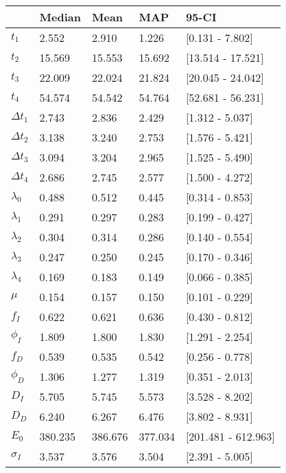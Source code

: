 \begin{tabular}{lllll}
\toprule
{} &   Median &     Mean &      MAP &                95-CI \\
\midrule
$t_1$        &    2.552 &    2.910 &    1.226 &      [0.131 - 7.802] \\
$t_2$        &   15.569 &   15.553 &   15.692 &    [13.514 - 17.521] \\
$t_3$        &   22.009 &   22.024 &   21.824 &    [20.045 - 24.042] \\
$t_4$        &   54.574 &   54.542 &   54.764 &    [52.681 - 56.231] \\
$\Delta t_1$ &    2.743 &    2.836 &    2.429 &      [1.312 - 5.037] \\
$\Delta t_2$ &    3.138 &    3.240 &    2.753 &      [1.576 - 5.421] \\
$\Delta t_3$ &    3.094 &    3.204 &    2.965 &      [1.525 - 5.490] \\
$\Delta t_4$ &    2.686 &    2.745 &    2.577 &      [1.500 - 4.272] \\
$\lambda_0$  &    0.488 &    0.512 &    0.445 &      [0.314 - 0.853] \\
$\lambda_1$  &    0.291 &    0.297 &    0.283 &      [0.199 - 0.427] \\
$\lambda_2$  &    0.304 &    0.314 &    0.286 &      [0.140 - 0.554] \\
$\lambda_3$  &    0.247 &    0.250 &    0.245 &      [0.170 - 0.346] \\
$\lambda_4$  &    0.169 &    0.183 &    0.149 &      [0.066 - 0.385] \\
$\mu$        &    0.154 &    0.157 &    0.150 &      [0.101 - 0.229] \\
$f_I$        &    0.622 &    0.621 &    0.636 &      [0.430 - 0.812] \\
$\phi_I$     &    1.809 &    1.800 &    1.830 &      [1.291 - 2.254] \\
$f_D$        &    0.539 &    0.535 &    0.542 &      [0.256 - 0.778] \\
$\phi_D$     &    1.306 &    1.277 &    1.319 &      [0.351 - 2.013] \\
$D_I$        &    5.705 &    5.745 &    5.573 &      [3.528 - 8.202] \\
$D_D$        &    6.240 &    6.267 &    6.476 &      [3.802 - 8.931] \\
$E_0$        &  380.235 &  386.676 &  377.034 &  [201.481 - 612.963] \\
$\sigma_I$   &    3.537 &    3.576 &    3.504 &      [2.391 - 5.005] \\

\end{tabular}
